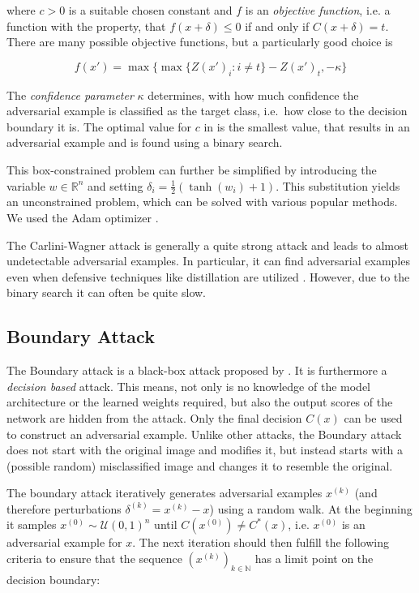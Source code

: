 where $c > 0$ is a suitable chosen constant and $f$ is an \emph{objective function}, i.e. a function with the property, that
$f(x + \delta) \leq 0$ if and only if $C(x + \delta) = t$.
There are many possible objective functions, but a particularly good choice is

\begin{equation}
\label{eq:cwobjective}
f(x') = \max \{ \max \{Z(x')_i : i \neq t \} - Z(x')_t, -\kappa \}
\end{equation}

The \emph{confidence parameter} $\kappa$ determines, with how much confidence the adversarial example is classified as the target class, i.e.\ how close to the decision boundary it is.
The optimal value for $c$ in  is the smallest value, that results in an adversarial example and is found using a binary search.

This box-constrained problem can further be simplified by introducing the variable $w \in \mathbb{R}^n$ and setting $\delta_i = \frac{1}{2} (\tanh(w_i) + 1)$.
This substitution yields an unconstrained problem, which can be solved with various popular methods. We used the Adam optimizer \citep{adam}.

The Carlini-Wagner attack is generally a quite strong attack and leads to almost undetectable adversarial examples.
In particular, it can find adversarial examples even when defensive techniques like distillation are utilized \citep{carlini}.
However, due to the binary search it can often be quite slow.

\subsection{Boundary Attack}

The Boundary attack is a black-box attack proposed by \citet{boundary}. It is furthermore a \emph{decision based} attack. This means, not only is no knowledge of the model architecture or the learned weights required, but also the output scores of the network are hidden from the attack. Only the final decision $C(x)$ can be used to construct an adversarial example.
Unlike other attacks, the Boundary attack does not start with the original image and modifies it, but instead starts with a (possible random) misclassified image and changes it to resemble the original.

The boundary attack iteratively generates adversarial examples $x^{(k)}$ (and therefore perturbations $\delta^{(k)} = x^{(k)} - x$) using a random walk. At the beginning it samples $x^{(0)} \sim \mathcal{U}(0,1)^n$ until $C(x^{(0)}) \neq C^*(x)$, i.e. $x^{(0)}$ is an adversarial example for $x$.
The next iteration should then fulfill the following criteria to ensure that the sequence $(x^{(k)})_{k \in \mathbb{N}}$ has a limit point on the decision boundary:


